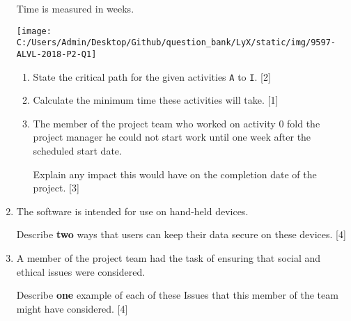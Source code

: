 \begin{enumerate}
Time is measured in weeks. 
\begin{center}
\texttt{[image: C:/Users/Admin/Desktop/Github/question\_bank/LyX/static/img/9597-ALVL-2018-P2-Q1]}
\par\end{center}
\begin{enumerate}
\item State the critical path for the given activities \texttt{A} to \texttt{I}.
\hfill{}{[}2{]}
\item Calculate the minimum time these activities will take. \hfill{}{[}1{]}
\item The member of the project team who worked on activity 0 fold the project
manager he could not start work until one week after the scheduled
start date. 

Explain any impact this would have on the completion date of the project.\hfill{}
{[}3{]}
\end{enumerate}
\item The software is intended for use on hand-held devices. 

Describe \textbf{two} ways that users can keep their data secure on
these devices.\hfill{} {[}4{]}
\item A member of the project team had the task of ensuring that social
and ethical issues were considered. 

Describe \textbf{one} example of each of these Issues that this member
of the team might have considered. \hfill{}{[}4{]}
\end{enumerate}